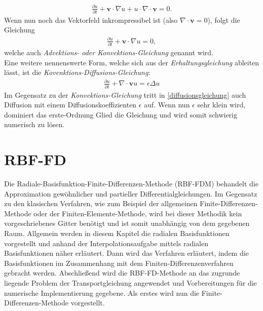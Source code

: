 \documentclass[12pt,titlepage]{article}
\begin{document}
\begin{align}
  \frac{\partial u}{\partial t}+\textbf{v}\cdot\nabla u + u \cdot \nabla \cdot\textbf{v}=0.
\end{align}
Wenn nun noch das Vektorfeld inkrompressibel ist (also $\nabla \cdot \textbf{v}=0$), folgt die Gleichung
\begin{align}
 \frac{\partial u}{\partial t}+\textbf{v}\cdot\nabla u=0,\label{eq:transport3}
\end{align}
welche auch \textit{Advektions- oder Konvektions-Gleichung} genannt wird.\\
Eine weitere nennenswerte Form, welche sich aus der \textit{Erhaltungsgleichung} ableiten lässt, ist die \textit{Kovenktions-Diffusions-Gleichung}:
\begin{align}
 \frac{\partial u}{\partial t}+\nabla \cdot \textbf{v}u = \epsilon\Delta u\label{diffusionsgleichung}
\end{align}
Im Gegensatz zu der \textit{Konvektions-Gleichung} tritt in \eqref{diffusionsgleichung} auch Diffusion mit einem Diffusionskoeffizienten $\epsilon$ auf. Wenn nun $\epsilon$ sehr klein wird, dominiert das erste-Ordnung Glied die Gleichung und wird somit schwierig numerisch zu lösen.
\pagebreak
\section{RBF-FD}\label{sec:RBF-FD}
Die Radiale-Basisfunktion-Finite-Differenzen-Methode (RBF-FDM) behandelt die Approximation gewöhnlicher und partieller Differentialgleichungen. Im Gegensatz zu den klasischen Verfahren, wie zum Beispiel der allgemeinen Finite-Differenzen-Methode oder der Finiten-Elemente-Methode, wird bei dieser Methodik kein vorgeschriebenes Gitter benötigt und ist somit unabhängig von dem gegebenen Raum. Allgemein werden in diesem Kapitel die radialen Basisfunktionen vorgestellt und anhand der Interpolationsaufgabe mittels radialen Basisfunktionen näher erläutert. Dann wird das Verfahren erläutert, indem die Basisfunktionen im Zusammenhang mit dem Finiten-Differenzenverfahren gebracht werden. Abschließend wird die RBF-FD-Methode an das zugrunde liegende Problem der Transportgleichung angewendet und Vorbereitungen für die numerische Implementierung gegebene. Als erstes wird nun die Finite-Differenzen-Methode vorgestellt.
\end{document}
